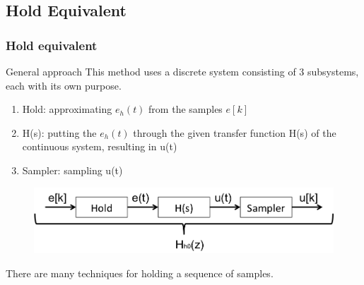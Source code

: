 \subsection{Hold Equivalent}
\begin{frame}
	\frametitle{Hold equivalent}
	\begin{block}{General approach}
		This method uses a discrete system consisting of 3 subsystems, each with its own purpose. 
		\begin{enumerate}
			\item Hold: approximating $e_h(t)$ from the samples $e[k]$
			\item H(s): putting the $e_h(t)$ through the given transfer function H(s) of the continuous system, resulting in u(t)
			\item Sampler: sampling u(t) 
		\end{enumerate}
		\vspace{-1em}
		\begin{figure}
			\centering
			\includegraphics[width=0.8\linewidth]{hold_equivalent}
		\end{figure}
		\vspace{-1em}
		There are many techniques for holding a sequence of samples.
	\end{block}
\end{frame}


